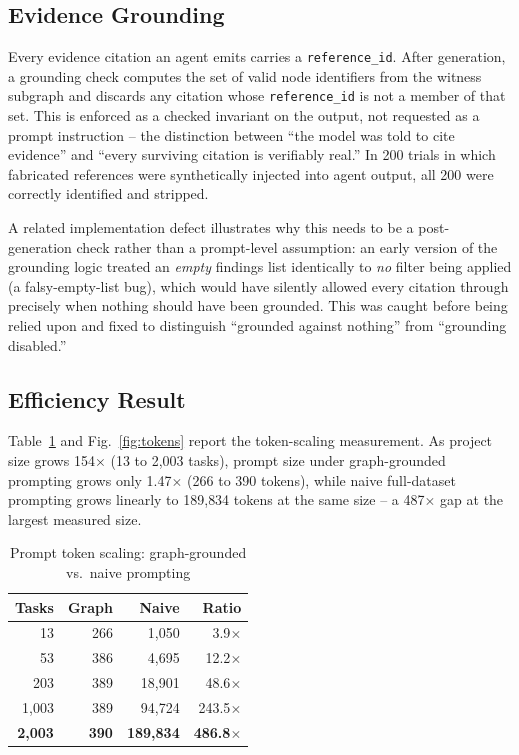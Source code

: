 \documentclass[conference]{IEEEtran}
\begin{document}
\subsection{Evidence Grounding}

Every evidence citation an agent emits carries a \texttt{reference\_id}. After
generation, a grounding check computes the set of valid node identifiers from the
witness subgraph and discards any citation whose \texttt{reference\_id} is not a
member of that set. This is enforced as a checked invariant on the output, not
requested as a prompt instruction -- the distinction between ``the model was told to
cite evidence'' and ``every surviving citation is verifiably real.'' In 200 trials in
which fabricated references were synthetically injected into agent output, all 200
were correctly identified and stripped.

A related implementation defect illustrates why this needs to be a post-generation
check rather than a prompt-level assumption: an early version of the grounding logic
treated an \emph{empty} findings list identically to \emph{no} filter being applied
(a falsy-empty-list bug), which would have silently allowed every citation through
precisely when nothing should have been grounded. This was caught before being
relied upon and fixed to distinguish ``grounded against nothing'' from ``grounding
disabled.''

\subsection{Efficiency Result}

Table~\ref{tab:tokens} and Fig.~\ref{fig:tokens} report the token-scaling
measurement. As project size grows 154$\times$ (13 to 2{,}003 tasks), prompt size
under graph-grounded prompting grows only 1.47$\times$ (266 to 390 tokens), while
naive full-dataset prompting grows linearly to 189{,}834 tokens at the same
size -- a 487$\times$ gap at the largest measured size.

\begin{table}[t]
\caption{Prompt token scaling: graph-grounded vs.\ naive prompting}
\label{tab:tokens}
\centering
\begin{tabular}{rrrr}
\toprule
\textbf{Tasks} & \textbf{Graph} & \textbf{Naive} & \textbf{Ratio} \\
\midrule
13 & 266 & 1{,}050 & 3.9$\times$ \\
53 & 386 & 4{,}695 & 12.2$\times$ \\
203 & 389 & 18{,}901 & 48.6$\times$ \\
1{,}003 & 389 & 94{,}724 & 243.5$\times$ \\
\textbf{2{,}003} & \textbf{390} & \textbf{189{,}834} & \textbf{486.8$\times$} \\
\bottomrule
\end{tabular}
\end{table}
\end{document}
